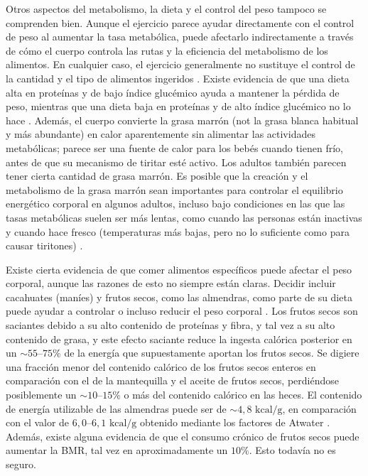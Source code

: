 \documentclass[12pt]{book}
\begin{document}
Otros aspectos del metabolismo, la dieta y el control del peso tampoco se comprenden bien. Aunque el ejercicio parece ayudar directamente con el control de peso al aumentar la tasa metabólica, puede afectarlo indirectamente a través de cómo el cuerpo controla las rutas y la eficiencia del metabolismo de los alimentos. En cualquier caso, el ejercicio generalmente no sustituye el control de la cantidad y el tipo de alimentos ingeridos \cite{67}. Existe evidencia de que una dieta alta en proteínas y de bajo índice glucémico ayuda a mantener la pérdida de peso, mientras que una dieta baja en proteínas y de alto índice glucémico no lo hace \cite{54}. Además, el cuerpo convierte la grasa marrón (not la grasa blanca habitual y más abundante) en calor aparentemente sin alimentar las actividades metabólicas; parece ser una fuente de calor para los bebés cuando tienen frío, antes de que su mecanismo de tiritar esté activo. Los adultos también parecen tener cierta cantidad de grasa marrón. Es posible que la creación y el metabolismo de la grasa marrón sean importantes para controlar el equilibrio energético corporal en algunos adultos, incluso bajo condiciones en las que las tasas metabólicas suelen ser más lentas, como cuando las personas están inactivas y cuando hace fresco (temperaturas más bajas, pero no lo suficiente como para causar tiritones) \cite{74}.

Existe cierta evidencia de que comer alimentos específicos puede afectar el peso corporal, aunque las razones de esto no siempre están claras. Decidir incluir cacahuates (maníes) y frutos secos, como las almendras, como parte de su dieta puede ayudar a controlar o incluso reducir el peso corporal \cite{64}. Los frutos secos son saciantes debido a su alto contenido de proteínas y fibra, y tal vez a su alto contenido de grasa, y este efecto saciante reduce la ingesta calórica posterior en un $\sim 55\text{--}75\%$ de la energía que supuestamente aportan los frutos secos. Se digiere una fracción menor del contenido calórico de los frutos secos enteros en comparación con el de la mantequilla y el aceite de frutos secos, perdiéndose posiblemente un $\sim 10\text{--}15\%$ o más del contenido calórico en las heces. El contenido de energía utilizable de las almendras puede ser de $\sim 4{,}8\text{ kcal/g}$, en comparación con el valor de $6{,}0\text{--}6{,}1\text{ kcal/g}$ obtenido mediante los factores de Atwater \cite{76}. Además, existe alguna evidencia de que el consumo crónico de frutos secos puede aumentar la BMR, tal vez en aproximadamente un $10\%$. Esto todavía no es seguro.
\end{document}
